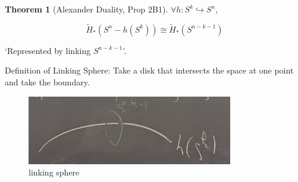 \documentclass{article}
\theoremstyle{definition}
\newtheorem{theorem}{Theorem}
\begin{document}
    \begin{theorem}
        [Alexander Duality, Prop 2B1]

        \(\forall h: S^k \hookrightarrow S^n\),
        
        \[
            \widetilde{H}_{\ast} (S^n - h(S^k)) \cong \widetilde{H}_{\ast} (S^{n-k-1})
        \]

        `Represented by linking \(S^{n-k-1}\)'.
    \end{theorem}    

    Definition of Linking Sphere: Take a disk that intersects the space at one point and take the boundary.

    \begin{figure}[H]
        \centering
        \includegraphics[width=0.8\textwidth]{img/linking}
        \caption{linking sphere}
    \end{figure}
\end{document}
